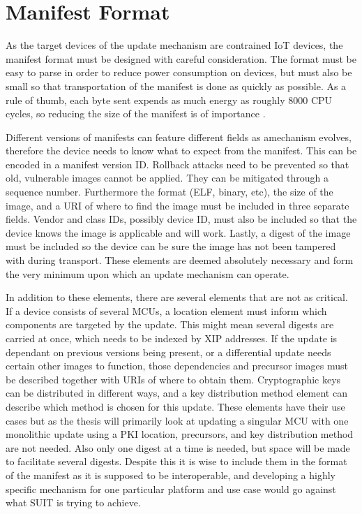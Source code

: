 \documentclass[0-thesis.tex]{subfiles}
\begin{document}

\section{Manifest Format}
\label{sec:manifest-format}
As the target devices of the update mechanism are contrained IoT devices, the manifest
format must be designed with careful consideration. The format must be easy to parse in
order to reduce power consumption on devices, but must also be small so that
transportation of the manifest is done as quickly as possible. As a rule of thumb, each
byte sent expends as much energy as roughly 8000 CPU cycles, so reducing the size of the
manifest is of importance \parencite{interconnecting}.

Different versions of manifests can feature different fields as amechanism evolves,
therefore the device needs to know what to expect from the manifest. This can be encoded
in a manifest version ID. Rollback attacks need to be prevented so that old, vulnerable
images cannot be applied. They can be mitigated through a sequence number. Furthermore the
format (ELF, binary, etc), the size of the image, and a URI of where to find the image must
be included in three separate fields. Vendor and class IDs, possibly device ID, must also
be included so that the device knows the image is applicable and will work. Lastly, a
digest of the image must be included so the device can be sure the image has not been
tampered with during transport. These elements are deemed absolutely necessary and form
the very minimum upon which an update mechanism can operate. 

In addition to these elements, there are several elements that are not as critical. If a
device consists of several MCUs, a location element must inform which components are
targeted by the update. This might mean several digests are carried at once, which needs
to be indexed by XIP addresses. If the update is dependant on previous versions being
present, or a differential update needs certain other images to function, those
dependencies and precursor images must be described together with URIs of where to obtain
them. Cryptographic keys can be distributed in different ways, and a key distribution
method element can describe which method is chosen for this update. These elements have
their use cases but as the thesis will primarily look at updating a singular MCU with one
monolithic update using a PKI location, precursors, and key distribution method are not
needed. Also only one digest at a time is needed, but space will be made to facilitate
several digests. Despite this it is wise to include them in the format of the manifest as
it is supposed to be interoperable, and developing a highly specific mechanism for one
particular platform and use case would go against what SUIT is trying to achieve.
\end{document}
